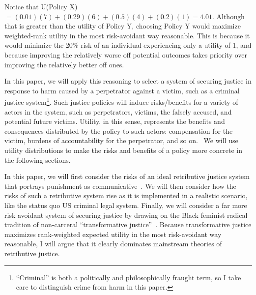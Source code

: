 \documentclass{article}
\begin{document}
        Notice that U(Policy X) $= (0.01)(7) + (0.29)(6) + (0.5)(4) + (0.2)(1) = 4.01$. Although that is greater than the utility of Policy Y, choosing Policy Y would maximize weighted-rank utility in the most risk-avoidant way reasonable. This is because it would minimize the 20\% risk of an individual experiencing only a utility of 1, and because improving the relatively worse off potential outcomes takes priority over improving the relatively better off ones. 

        In this paper, we will apply this reasoning to select a system of securing justice in response to harm caused by a perpetrator against a victim, such as a criminal justice system\footnote{``Criminal'' is both a politically and philosophically fraught term, so I take care to distinguish crime from harm in this paper.}. Such justice policies will induce risks/benefits for a variety of actors in the system, such as perpetrators, victims, the falsely accused, and potential future victims. Utility, in this sense, represents the benefits and consequences distributed by the policy to such actors: compensation for the victim, burdens of accountability for the perpetrator, and so on. \ We will use utility distributions to make the risks and benefits of a policy more concrete in the following sections. 


        In this paper, we will first consider the risks of an ideal retributive justice system that portrays punishment as communicative~\cite{communicative-retribution}. We will then consider how the risks of such a retributive system rise as it is implemented in a realistic scenario, like the status quo US criminal legal system. Finally, we will consider a far more risk avoidant system of securing justice by drawing on the Black feminist radical tradition of non-carceral ``transformative justice''~\cite{beyond-survival}. Because transformative justice maximizes rank-weighted expected utility in the most risk-avoidant way reasonable, I will argue that it clearly dominates mainstream theories of retributive justice. 


\end{document}
